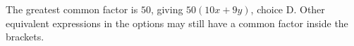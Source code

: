 The greatest common factor is $50$, giving $\boxed{50(10x+9y)}$, choice D. Other equivalent expressions in the options may still have a common factor inside the brackets.
